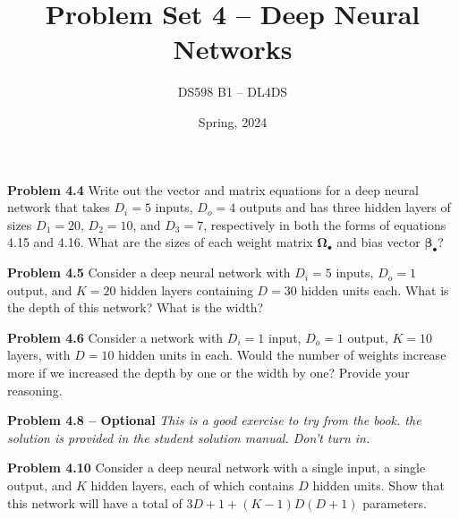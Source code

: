 \documentclass[11pt, oneside]{article}   	%
\title{Problem Set 4 -- Deep Neural Networks}
\author{DS598 B1 -- DL4DS}
\date{Spring, 2024}							%
\begin{document}
\maketitle

\textbf{Problem 4.4\footnotemark} Write out the vector and matrix equations for
a deep neural network that takes
\(D_i = 5\) inputs, \(D_o = 4\) outputs and has three hidden layers of sizes
\(D_1 = 20\), \(D_2 = 10\), and \(D_3 = 7\), respectively in both the forms of
equations 4.15 and 4.16. What are the sizes of each weight matrix
\(\mathbf{\Omega_\bullet}\) and
bias vector \(\mathbf{\beta_\bullet}\)?


\vspace{1cm}

\textbf{Problem 4.5} 
Consider a deep neural network with \(D_i = 5\) inputs, \(D_o = 1\) output,
and \(K = 20\) hidden layers containing \(D = 30\) hidden units each. What is
the depth of this network? What is the width?

\vspace{1cm}

\textbf{Problem 4.6} Consider a network with \(D_i = 1\) input, \(D_o = 1\)
output, \(K = 10\) layers, with \(D = 10\) hidden units in each. Would the
number of weights increase more if we increased the depth by
one or the width by one? Provide your reasoning.

\vspace{1cm}

\textbf{Problem 4.8 -- Optional} \textit{This is a good exercise to try from the book.
the solution is provided in the student solution manual. Don't turn in.}

\vspace{1cm}

\textbf{Problem 4.10} Consider a deep neural network with a single input, a
single output, and \(K\) hidden layers, each of which contains \(D\) hidden
units. Show that this network will have a total
of \( 3D + 1 + (K - 1)D(D + 1)\) parameters.
\end{document}
